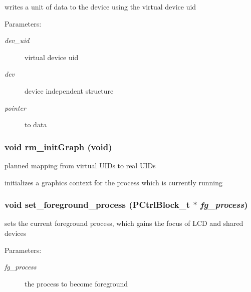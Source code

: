 writes a unit of data to the device using the virtual device uid 

\begin{Desc}
\item[Parameters:]
\begin{description}
\item[{\em dev\_\-uid}]virtual device uid \item[{\em dev}]device independent structure \item[{\em pointer}]to data \end{description}
\end{Desc}
\hypertarget{group___r_e_s_o_u_r_c_e___m_g521d6b7564e57ef0d80abea4b53d6c7f}{
\subsubsection[{rm\_\-initGraph}]{\setlength{\rightskip}{0pt plus 5cm}void rm\_\-initGraph (void)}}
\label{group___r_e_s_o_u_r_c_e___m_g521d6b7564e57ef0d80abea4b53d6c7f}


planned mapping from virtual UIDs to real UIDs 

initializes a graphics context for the process which is currently running \hypertarget{group___r_e_s_o_u_r_c_e___m_gb922966b175c37acd17f1152c188b987}{
\subsubsection[{set\_\-foreground\_\-process}]{\setlength{\rightskip}{0pt plus 5cm}void set\_\-foreground\_\-process ({\bf PCtrlBlock\_\-t} $\ast$ {\em fg\_\-process})}}
\label{group___r_e_s_o_u_r_c_e___m_gb922966b175c37acd17f1152c188b987}


sets the current foreground process, which gains the focus of LCD and shared devices 

\begin{Desc}
\item[Parameters:]
\begin{description}
\item[{\em fg\_\-process}]the process to become foreground \end{description}
\end{Desc}
